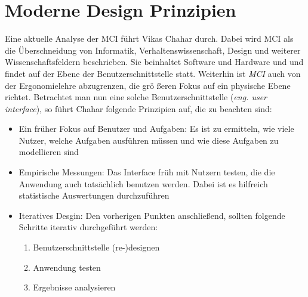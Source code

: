 \section{Moderne Design Prinzipien}
Eine aktuelle Analyse der \gls{MCI} f\"uhrt Vikas Chahar \cite{bib:Chahar} durch. Dabei wird \gls{MCI} als die \"Uberschneidung von Informatik, Verhaltenswissenschaft, Design und weiterer Wissenschaftsfeldern beschrieben. Sie beinhaltet Software und Hardware und und findet auf der Ebene der Benutzerschnittstelle statt. Weiterhin ist \textit{MCI} auch von der Ergonomielehre abzugrenzen, die gr\"o \ss eren Fokus auf ein physische Ebene richtet.
\newline
Betrachtet man nun eine solche Benutzerschnittstelle (\textit{eng. user interface}), so f\"uhrt Chahar folgende Prinzipien auf, die zu beachten sind:
\begin{itemize}
\item Ein fr\"uher Fokus auf Benutzer und Aufgaben: Es ist zu ermitteln, wie viele Nutzer, welche Aufgaben ausf\"uhren m\"ussen und wie diese Aufgaben zu modellieren sind
\item Empirische Messungen: Das Interface fr\"uh mit Nutzern testen, die die Anwendung auch tats\"achlich benutzen werden. Dabei ist es hilfreich statistische Auswertungen durchzuf\"uhren
\item Iteratives Desgin: Den vorherigen Punkten anschlie\ss end, sollten folgende Schritte iterativ durchgef\"uhrt werden:
\begin{enumerate}
\item Benutzerschnittstelle (re-)designen
\item Anwendung testen
\item Ergebnisse analysieren
\end{enumerate}
\end{itemize}

